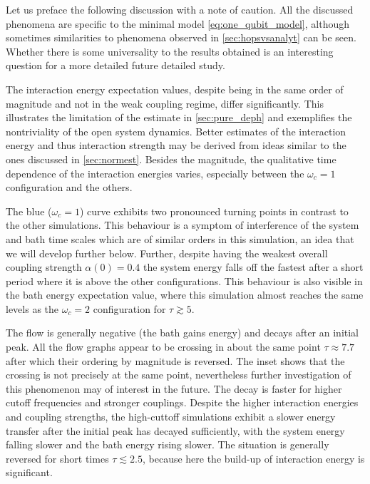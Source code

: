 Let us preface the following discussion with a note of caution. All
the discussed phenomena are specific to the minimal model
\cref{eq:one_qubit_model}, although sometimes similarities to
phenomena observed in \cref{sec:hopsvsanalyt} can be seen. Whether
there is some universality to the results obtained is an interesting
question for a more detailed future detailed study.

The interaction energy expectation values, despite being in the same
order of magnitude and not in the weak coupling regime, differ
significantly. This illustrates the limitation of the estimate in
\cref{sec:pure_deph} and exemplifies the nontriviality of the open
system dynamics. Better estimates of the interaction energy and thus
interaction strength may be derived from ideas similar to the ones
discussed in \cref{sec:normest}.  Besides the magnitude, the
qualitative time dependence of the interaction energies varies,
especially between the \(ω_c=1\) configuration and the others.

The blue (\(ω_c=1\)) curve exhibits two pronounced turning points in
contrast to the other simulations. This behaviour is a symptom of
interference of the system and bath time scales which are of similar
orders in this simulation, an idea that we will develop further
below. Further, despite having the weakest overall coupling strength
\(α(0)=0.4\) the system energy falls off the fastest after a short
period where it is above the other configurations. This behaviour is
also visible in the bath energy expectation value, where this
simulation almost reaches the same levels as the \(ω_c=2\)
configuration for \(τ\gtrsim 5\).

The flow is generally negative (the bath gains energy) and decays
after an initial peak. All the flow graphs appear to be crossing in
about the same point \(τ\approx 7.7\) after which their ordering by
magnitude is reversed.  The inset shows that the crossing is not
precisely at the same point, nevertheless further investigation of
this phenomenon may of interest in the future. The decay is faster for
higher cutoff frequencies and stronger couplings. Despite the higher
interaction energies and coupling strengths, the high-cuttoff
simulations exhibit a slower energy transfer after the initial peak
has decayed sufficiently, with the system energy falling slower and
the bath energy rising slower. The situation is generally reversed for
short times \(τ\lesssim 2.5\), because here the build-up of
interaction energy is significant.

